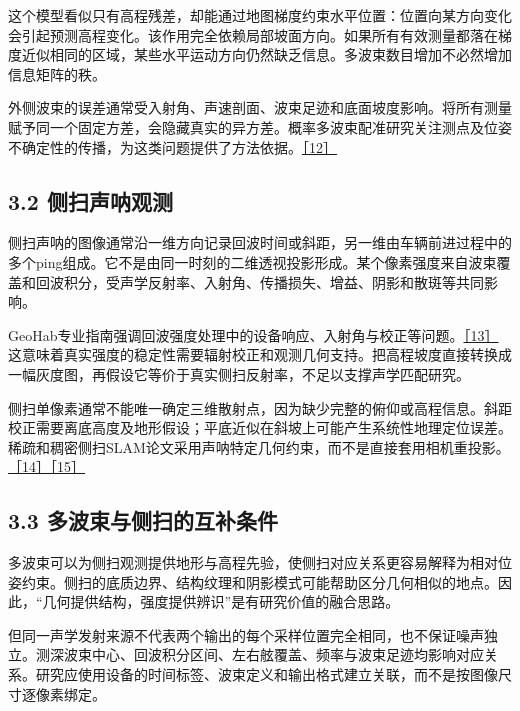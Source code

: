 这个模型看似只有高程残差，却能通过地图梯度约束水平位置：位置向某方向变化会引起预测高程变化。该作用完全依赖局部坡面方向。如果所有有效测量都落在梯度近似相同的区域，某些水平运动方向仍然缺乏信息。多波束数目增加不必然增加信息矩阵的秩。

外侧波束的误差通常受入射角、声速剖面、波束足迹和底面坡度影响。将所有测量赋予同一个固定方差，会隐藏真实的异方差。概率多波束配准研究关注测点及位姿不确定性的传播，为这类问题提供了方法依据。\href{https://pmc.ncbi.nlm.nih.gov/articles/PMC4851074/}{［12］}

\hypertarget{ux4fa7ux626bux58f0ux5450ux89c2ux6d4b}{%
\subsection{3.2 侧扫声呐观测}\label{ux4fa7ux626bux58f0ux5450ux89c2ux6d4b}}

侧扫声呐的图像通常沿一维方向记录回波时间或斜距，另一维由车辆前进过程中的多个ping组成。它不是由同一时刻的二维透视投影形成。某个像素强度来自波束覆盖和回波积分，受声学反射率、入射角、传播损失、增益、阴影和散斑等共同影响。

GeoHab专业指南强调回波强度处理中的设备响应、入射角与校正等问题。\href{https://geohab.org/backscatter-working-group/}{［13］} 这意味着真实强度的稳定性需要辐射校正和观测几何支持。把高程坡度直接转换成一幅灰度图，再假设它等价于真实侧扫反射率，不足以支撑声学匹配研究。

侧扫单像素通常不能唯一确定三维散射点，因为缺少完整的俯仰或高程信息。斜距校正需要离底高度及地形假设；平底近似在斜坡上可能产生系统性地理定位误差。稀疏和稠密侧扫SLAM论文采用声呐特定几何约束，而不是直接套用相机重投影。\href{https://arxiv.org/abs/2304.01854}{［14］}\href{https://arxiv.org/abs/2312.13802}{［15］}

\hypertarget{ux591aux6ce2ux675fux4e0eux4fa7ux626bux7684ux4e92ux8865ux6761ux4ef6}{%
\subsection{3.3 多波束与侧扫的互补条件}\label{ux591aux6ce2ux675fux4e0eux4fa7ux626bux7684ux4e92ux8865ux6761ux4ef6}}

多波束可以为侧扫观测提供地形与高程先验，使侧扫对应关系更容易解释为相对位姿约束。侧扫的底质边界、结构纹理和阴影模式可能帮助区分几何相似的地点。因此，``几何提供结构，强度提供辨识''是有研究价值的融合思路。

但同一声学发射来源不代表两个输出的每个采样位置完全相同，也不保证噪声独立。测深波束中心、回波积分区间、左右舷覆盖、频率与波束足迹均影响对应关系。研究应使用设备的时间标签、波束定义和输出格式建立关联，而不是按图像尺寸逐像素绑定。

